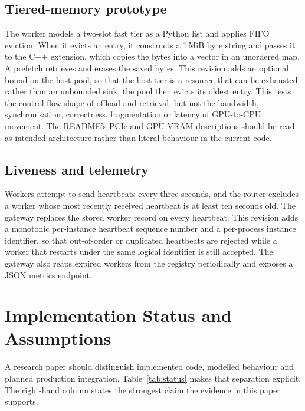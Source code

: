 \documentclass[10pt,twocolumn]{article}
\begin{document}
\subsection{Tiered-memory prototype}

The worker models a two-slot fast tier as a Python list and applies FIFO
eviction. When it evicts an entry, it constructs a 1\,MiB byte string and
passes it to the C++ extension, which copies the bytes into a vector in an
unordered map. A prefetch retrieves and erases the saved bytes. This revision
adds an optional bound on the host pool, so that the host tier is a resource
that can be exhausted rather than an unbounded sink; the pool then evicts its
oldest entry. This tests the control-flow shape of offload and retrieval, but
not the bandwidth, synchronisation, correctness, fragmentation or latency of
GPU-to-CPU movement. The README's PCIe and GPU-VRAM descriptions should be
read as intended architecture rather than literal behaviour in the current
code.

\subsection{Liveness and telemetry}

Workers attempt to send heartbeats every three seconds, and the router
excludes a worker whose most recently received heartbeat is at least ten
seconds old. The gateway replaces the stored worker record on every heartbeat.
This revision adds a monotonic per-instance heartbeat sequence number and a
per-process instance identifier, so that out-of-order or duplicated heartbeats
are rejected while a worker that restarts under the same logical identifier is
still accepted. The gateway also reaps expired workers from the registry
periodically and exposes a JSON metrics endpoint.

\section{Implementation Status and Assumptions}

A research paper should distinguish implemented code, modelled behaviour and
planned production integration. Table~\ref{tab:status} makes that separation
explicit. The right-hand column states the strongest claim the evidence in
this paper supports.
\end{document}
